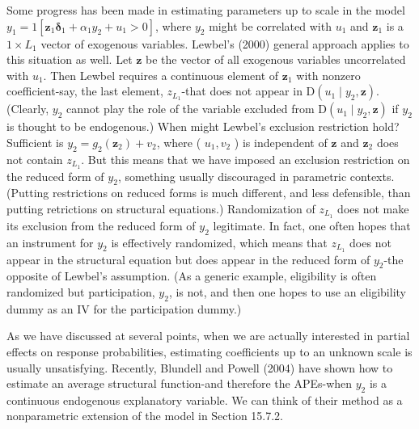 \documentclass[10pt]{article}
\begin{document}
Some progress has been made in estimating parameters up to scale in the model $y_{1}=1\left[\mathbf{z}_{1} \boldsymbol{\delta}_{1}+\alpha_{1} y_{2}+u_{1}>0\right]$, where $y_{2}$ might be correlated with $u_{1}$ and $\mathbf{z}_{1}$ is a $1 \times L_{1}$ vector of exogenous variables. Lewbel's (2000) general approach applies to this situation as well. Let $\mathbf{z}$ be the vector of all exogenous variables uncorrelated with $u_{1}$. Then Lewbel requires a continuous element of $\mathbf{z}_{1}$ with nonzero coefficient-say, the last element, $z_{L_{1}}$-that does not appear in $\mathrm{D}\left(u_{1} \mid y_{2}, \mathbf{z}\right)$. (Clearly, $y_{2}$ cannot play the role of the variable excluded from $\mathrm{D}\left(u_{1} \mid y_{2}, \mathbf{z}\right)$ if $y_{2}$ is thought to be endogenous.) When might Lewbel's exclusion restriction hold? Sufficient is $y_{2}=g_{2}\left(\mathbf{z}_{2}\right)+v_{2}$, where ( $u_{1}, v_{2}$ ) is independent of $\mathbf{z}$ and $\mathbf{z}_{2}$ does not contain $z_{L_{1}}$. But this means that we have imposed an exclusion restriction on the reduced form of $y_{2}$, something usually discouraged in parametric contexts. (Putting restrictions on reduced forms is much different, and less defensible, than putting retrictions on structural equations.) Randomization of $z_{L_{1}}$ does not make its exclusion from the reduced form of $y_{2}$ legitimate. In fact, one often hopes that an instrument for $y_{2}$ is effectively randomized, which means that $z_{L_{1}}$ does not appear in the structural equation but does appear in the reduced form of $y_{2}$-the opposite of Lewbel's assumption. (As a generic example, eligibility is often randomized but participation, $y_{2}$, is not, and then one hopes to use an eligibility dummy as an IV for the participation dummy.)

As we have discussed at several points, when we are actually interested in partial effects on response probabilities, estimating coefficients up to an unknown scale is usually unsatisfying. Recently, Blundell and Powell (2004) have shown how to estimate an average structural function-and therefore the APEs-when $y_{2}$ is a continuous endogenous explanatory variable. We can think of their method as a nonparametric extension of the model in Section 15.7.2.
\end{document}
